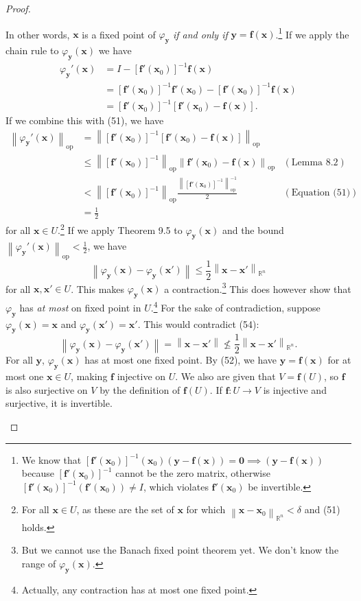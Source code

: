 \documentclass{article}
\newcommand{\R}{\mathbb{R}}
\newcommand{\x}{\mathbf{x}}
\newcommand{\f}{\mathbf{f}}
\newcommand{\y}{\mathbf{y}}
\newcommand{\ze}{\mathbf{0}}
\newcommand{\norm}[1]{\left\lVert#1\right\rVert}
\newcommand{\normop}[1]{\left\lVert#1\right\rVert_\text{op}}
\theoremstyle{definition}
\begin{document}
\begin{proof}
\begin{enumerate}
\begin{equation}
			\end{equation}In other words, $ \x $ is a fixed point of $ \varphi_\y $ \textit{if and only if} $ \y = \f(\x) $.\footnote{We know that $[\f'(\x_0)]^{-1}(\x_0)(\y - \f(\x)) = \ze \implies (\y - \f(\x))$ because $ [\f'(\x_0)]^{-1} $ cannot be the zero matrix, otherwise $ [\f'(\x_0)]^{-1}(\f'(\x_0))\neq I $, which violates $ \f'(\x_0) $ be invertible.} If we apply the chain rule to $ \varphi_\y(\x) $ we have
			\begin{align}
				\varphi_\y'(\x) &= I -  [\f'(\x_0)]^{-1} \f(\x)\nonumber\\ 
				& =  [\f'(\x_0)]^{-1}\f'(\x_0) -  [\f'(\x_0)]^{-1} \f(\x)\nonumber\\ 
				& = [\f'(\x_0)]^{-1}\left[\f'(\x_0) - \f(\x)\right].
			\end{align}
			If we combine this with (51), we have 
			\begin{align*}
				\normop{\varphi_\y'(\x)} & = \normop{[\f'(\x_0)]^{-1}\left[\f'(\x_0) - \f(\x)\right]} \\
				& \le \normop{[\f'(\x_0)]^{-1}}\normop{\f'(\x_0) - \f(\x)}& (\text{Lemma 8.2})\\ & 
				< \normop{[\f'(\x_0)]^{-1}}\frac{\normop{[\f'(\x_0)]^{-1}}^{-1}}{2} & (\text{Equation (51)})\\
				& = \frac{1}{2}
			\end{align*}
			for all $ \x \in U $.\footnote{For all $ \x\in U $, as these are the set of $ \x $ for which $ \norm{\x-\x_0}_{\R^n} < \delta $ and (51) holds.} If we apply Theorem 9.5 to $ \varphi_\y(\x) $ and the bound $ 	\normop{\varphi_\y'(\x)} < \frac{1}{2} $, we have 
			\begin{equation}\label{key}
				\norm{\varphi_\y(\x) - \varphi_\y(\x')} \le \frac{1}{2}\norm{\x-\x'}_{\R^n} 
			\end{equation}
			for all $ \x,\x'\in U $. This makes $ \varphi_\y(\x) $ a contraction.\footnote{But we cannot use the Banach fixed point theorem yet. We don't know the range of $ \varphi_\y(\x) $.} This does however show that $ \varphi_\y $ has \textit{at most} on fixed point in $ U $.\footnote{Actually, any contraction has at most one fixed point.} For the sake of contradiction, suppose $ \varphi_\y(\x)=\x $ and $ \varphi_\y(\x')=\x'  $. This would contradict (54): 
			$$ \norm{\varphi_\y(\x) - \varphi_\y(\x')} = \norm{\x - \x'} \not\le  \frac{1}{2}\norm{\x-\x'}_{\R^n} .$$
			For all $ \y $, $ \varphi_\y(\x) $ has at most one fixed point. By (52), we have $ \y = \f(\x) $ for at most one $ \x\in U $, making $ \f $ injective on $ U $. We also are given that $ V = \f(U) $, so $ \f $ is also surjective on $ V $ by the definition of $ \f(U) $. If $ \f:U\to V $ is injective and surjective, it is invertible. 

\end{enumerate}
\end{proof}
\end{document}
